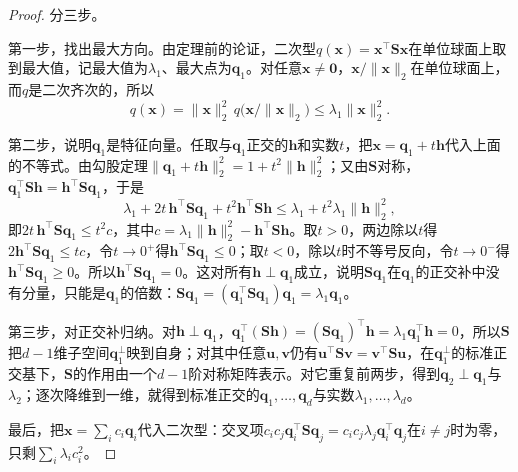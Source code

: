 \begin{proof}
分三步。

第一步，找出最大方向。由定理前的论证，二次型$q(\bm x)=\bm x^\top\bm S\bm x$在单位球面上取到最大值，记最大值为$\lambda_1$、最大点为$\bm q_1$。对任意$\bm x\neq\bm0$，$\bm x/\lVert\bm x\rVert_2$在单位球面上，而$q$是二次齐次的，所以
\[
 q(\bm x)=\lVert\bm x\rVert_2^2\,q\bigl(\bm x/\lVert\bm x\rVert_2\bigr)\leq\lambda_1\lVert\bm x\rVert_2^2 .
\]

第二步，说明$\bm q_1$是特征向量。任取与$\bm q_1$正交的$\bm h$和实数$t$，把$\bm x=\bm q_1+t\bm h$代入上面的不等式。由勾股定理$\lVert\bm q_1+t\bm h\rVert_2^2=1+t^2\lVert\bm h\rVert_2^2$；又由$\bm S$对称，$\bm q_1^\top\bm S\bm h=\bm h^\top\bm S\bm q_1$，于是
\[
 \lambda_1+2t\,\bm h^\top\bm S\bm q_1+t^2\bm h^\top\bm S\bm h
 \leq\lambda_1+t^2\lambda_1\lVert\bm h\rVert_2^2 ,
\]
即$2t\,\bm h^\top\bm S\bm q_1\leq t^2c$，其中$c=\lambda_1\lVert\bm h\rVert_2^2-\bm h^\top\bm S\bm h$。取$t>0$，两边除以$t$得$2\bm h^\top\bm S\bm q_1\leq tc$，令$t\to0^+$得$\bm h^\top\bm S\bm q_1\leq0$；取$t<0$，除以$t$时不等号反向，令$t\to0^-$得$\bm h^\top\bm S\bm q_1\geq0$。所以$\bm h^\top\bm S\bm q_1=0$。这对所有$\bm h\perp\bm q_1$成立，说明$\bm S\bm q_1$在$\bm q_1$的正交补中没有分量，只能是$\bm q_1$的倍数：$\bm S\bm q_1=(\bm q_1^\top\bm S\bm q_1)\bm q_1=\lambda_1\bm q_1$。

第三步，对正交补归纳。对$\bm h\perp\bm q_1$，$\bm q_1^\top(\bm S\bm h)=(\bm S\bm q_1)^\top\bm h=\lambda_1\bm q_1^\top\bm h=0$，所以$\bm S$把$d-1$维子空间$\bm q_1^\perp$映到自身；对其中任意$\bm u,\bm v$仍有$\bm u^\top\bm S\bm v=\bm v^\top\bm S\bm u$，在$\bm q_1^\perp$的标准正交基下，$\bm S$的作用由一个$d-1$阶对称矩阵表示。对它重复前两步，得到$\bm q_2\perp\bm q_1$与$\lambda_2$；逐次降维到一维，就得到标准正交的$\bm q_1,\dots,\bm q_d$与实数$\lambda_1,\ldots,\lambda_d$。

最后，把$\bm x=\sum_ic_i\bm q_i$代入二次型：交叉项$c_ic_j\bm q_i^\top\bm S\bm q_j=c_ic_j\lambda_j\bm q_i^\top\bm q_j$在$i\neq j$时为零，只剩$\sum_i\lambda_ic_i^2$。
\end{proof}

